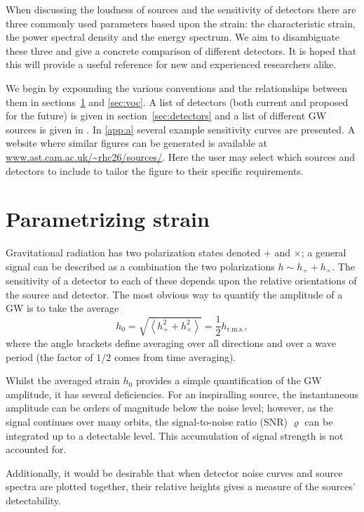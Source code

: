 \documentclass[fleqn,12pt]{iopart}
\newcommand{\sub}[1]{\ensuremath{_\mathrm{#1}}}
\begin{document}
When discussing the loudness of sources and the sensitivity of detectors there are three commonly used parameters based upon the strain: the characteristic strain, the power spectral density and the energy spectrum. We aim to disambiguate these three and give a concrete comparison of different detectors. It is hoped that this will provide a useful reference for new and experienced researchers alike.

We begin by expounding the various conventions and the relationships between them in sections~\ref{sec:strains} and \ref{sec:voc}. A list of detectors (both current and proposed for the future) is given in section~\ref{sec:detectors} and a list of different GW sources is given in . In \ref{app:a} several example sensitivity curves are presented. A website where similar figures can be generated is available at \url{www.ast.cam.ac.uk/~rhc26/sources/}. Here the user may select which sources and detectors to include to tailor the figure to their specific requirements.

\section{Parametrizing strain}\label{sec:strains}

Gravitational radiation has two polarization states denoted $+$ and $\times$; a general signal can be described as a combination the two polarizations $h \sim h_{+} + h_{\times}$. The sensitivity of a detector to each of these depends upon the relative orientations of the source and detector. The most obvious way to quantify the amplitude of a GW is to take the average
\begin{equation}\label{eq:h0}
h_{0} = \sqrt{\left< h_{+}^{2} + h_{\times}^{2} \right>} = \frac{1}{2} h\sub{r.m.s.},
\end{equation}
where the angle brackets define averaging over all directions and over a wave period (the factor of $1/2$ comes from time averaging).

Whilst the averaged strain $h_0$ provides a simple quantification of the GW amplitude, it has several deficiencies. For an inspiralling source, the instantaneous amplitude can be orders of magnitude below the noise level; however, as the signal continues over many orbits, the signal-to-noise ratio (SNR) $\varrho$ can be integrated up to a detectable level. This accumulation of signal strength is not accounted for.

Additionally, it would be desirable that when detector noise curves and source spectra are plotted together, their relative heights gives a measure of the sources' detectability.
\end{document}
